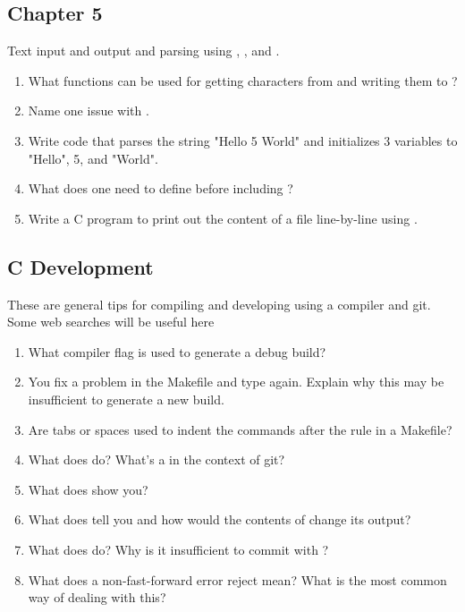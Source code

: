 \subsection{Chapter 5}

Text input and output and parsing using , , and .

\begin{enumerate}
\item What functions can be used for getting characters from  and writing them to ?
\item Name one issue with .
\item Write code that parses the string "Hello 5 World" and initializes 3 variables to "Hello", 5, and "World".
\item What does one need to define before including ?
\item Write a C program to print out the content of a file line-by-line using .
\end{enumerate}

\subsection{C Development}

These are general tips for compiling and developing using a compiler and git.
Some web searches will be useful here

\begin{enumerate}
\item What compiler flag is used to generate a debug build?
\item You fix a problem in the Makefile and type  again.
Explain why this may be insufficient to generate a new build.
\item Are tabs or spaces used to indent the commands after the rule in a Makefile?
\item What does  do? What's a  in the context of git?
\item What does  show you?
\item What does  tell you and how would the contents of  change its output?
\item What does  do? Why is it insufficient to commit with ?
\item What does a non-fast-forward error  reject mean? What is the most common way of dealing with this?
\end{enumerate}

